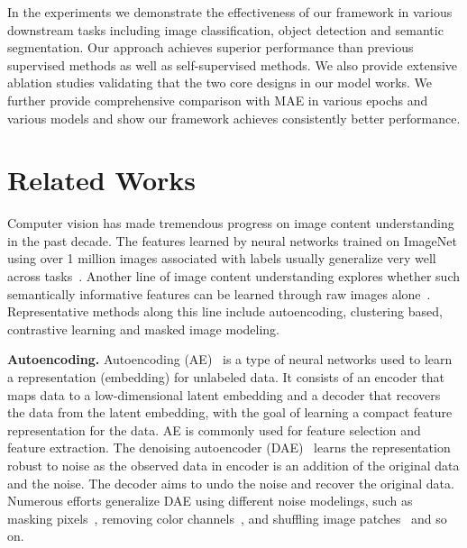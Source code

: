 \documentclass[runningheads]{llncs}
\begin{document}
In the experiments we demonstrate the effectiveness of our framework in various downstream tasks including image classification, object detection and semantic segmentation. Our approach achieves superior performance than previous supervised methods as well as self-supervised methods. We also provide extensive ablation studies validating that the two core designs in our model works. 
We further provide comprehensive comparison with MAE in various epochs and various models and show our framework achieves consistently better performance.


\vspace{-1mm}
\section{Related Works}
\vspace{-1mm}
Computer vision has made tremendous progress on image content understanding in the past decade. The features learned by neural networks trained on ImageNet using over 1 million images associated with labels usually generalize very well across tasks~\cite{donahue2014decaf,sun2017revisiting,kolesnikov2020big,carreira2017quo}. Another line of image content understanding explores whether such semantically informative features can be learned through raw images alone~\cite{dosovitskiy2014discriminative,doersch2015unsupervised,xie2016unsupervised,van2018representation,yang2016joint,zhuang2019local,ermolov2021whitening,henaff2020data,chen2020simple,he2020momentum}. Representative methods along this line include autoencoding, clustering based, contrastive learning and masked image modeling.

\noindent \textbf{Autoencoding.}
Autoencoding (AE)~\cite{hinton2006reducing,bengio2009learning} is a type of neural networks used to learn a representation (embedding) for unlabeled data. 
It consists of an encoder that maps data to a low-dimensional latent embedding and a decoder that recovers the data from the latent embedding, 
with the goal of learning a compact feature representation for the data.
AE is commonly used for feature selection and feature extraction.
The denoising autoencoder (DAE)~\cite{vincent2008extracting} learns the representation robust to noise as the observed data in encoder is an addition of the original data and the noise. The decoder aims to undo the noise and recover the original data. 
Numerous efforts generalize DAE using different noise modelings, such as masking pixels~\cite{vincent2010stacked,pathak2016context,chen2020generative}, removing color channels~\cite{zhang2016colorful,larsson2016learning}, and shuffling image patches~\cite{noroozi2016unsupervised} and so on.
\end{document}
